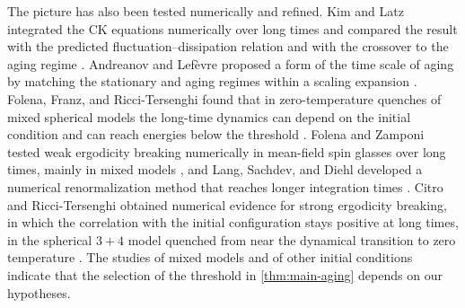 The picture has also been tested numerically and refined. Kim and Latz integrated the CK equations numerically over long times and compared the result with the predicted fluctuation--dissipation relation and with the crossover to the aging regime \cite{kimlatz2001}. Andreanov and Lef\`evre proposed a form of the time scale of aging by matching the stationary and aging regimes within a scaling expansion \cite{andreanovlefevre2006}. Folena, Franz, and Ricci-Tersenghi found that in zero-temperature quenches of mixed spherical models the long-time dynamics can depend on the initial condition and can reach energies below the threshold \cite[Sections~V--VII]{folena2020}. Folena and Zamponi tested weak ergodicity breaking numerically in mean-field spin glasses over long times, mainly in mixed models \cite{folenazamponi2023}, and Lang, Sachdev, and Diehl developed a numerical renormalization method that reaches longer integration times \cite{lang2025}. Citro and Ricci-Tersenghi obtained numerical evidence for strong ergodicity breaking, in which the correlation with the initial configuration stays positive at long times, in the spherical $3+4$ model quenched from near the dynamical transition to zero temperature \cite{citro2025}. The studies of mixed models and of other initial conditions indicate that the selection of the threshold in \cref{thm:main-aging} depends on our hypotheses.

